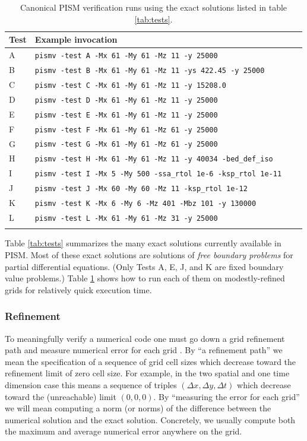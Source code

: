 \documentclass[11pt,final]{amsart}
\begin{document}
\begin{table}[ht]
\caption{Canonical PISM verification runs using the exact solutions listed in table \ref{tab:tests}.}\label{tab:tests_exec}
\small
\begin{tabular}{@{}llll}\hline
\textbf{Test} & \textbf{Example invocation}  \\ \hline
A & \verb|pismv -test A -Mx 61 -My 61 -Mz 11 -y 25000| \\
B & \verb|pismv -test B -Mx 61 -My 61 -Mz 11 -ys 422.45 -y 25000|  \\
C & \verb|pismv -test C -Mx 61 -My 61 -Mz 11 -y 15208.0|  \\
D & \verb|pismv -test D -Mx 61 -My 61 -Mz 11 -y 25000|  \\
E & \verb|pismv -test E -Mx 61 -My 61 -Mz 11 -y 25000|  \\
F & \verb|pismv -test F -Mx 61 -My 61 -Mz 61 -y 25000|  \\
G & \verb|pismv -test G -Mx 61 -My 61 -Mz 61 -y 25000|  \\
H & \verb|pismv -test H -Mx 61 -My 61 -Mz 11 -y 40034 -bed_def_iso| \\
I & \verb|pismv -test I -Mx 5 -My 500 -ssa_rtol 1e-6 -ksp_rtol 1e-11| \\
J & \verb|pismv -test J -Mx 60 -My 60 -Mz 11 -ksp_rtol 1e-12| \\
K & \verb|pismv -test K -Mx 6 -My 6 -Mz 401 -Mbz 101 -y 130000| \\
L & \verb|pismv -test L -Mx 61 -My 61 -Mz 31 -y 25000| \\
\hline
\normalsize
\end{tabular}
\end{table}

Table \ref{tab:tests} summarizes the many exact solutions currently available in PISM.  Most of these exact solutions are solutions of \emph{free boundary problems} for partial differential equations.  (Only Tests A, E, J, and K are fixed boundary value problems.)  Table \ref{tab:tests_exec} shows how to run each of them on modestly-refined grids for relatively quick execution time.


\subsubsection*{Refinement}  To meaningfully verify a numerical code one must go down a grid refinement path and measure numerical error for each grid \cite{Roache}.  By ``a refinement path'' we mean the specification of a sequence of grid cell sizes which decrease toward the refinement limit of zero cell size.  For example, in the two spatial and one time dimension case this means a sequence of triples $(\Delta x,\Delta y,\Delta t)$ which decrease toward the (unreachable) limit $(0,0,0)$.  By ``measuring the error for each grid'' we will mean computing a norm (or norms) of the difference between the numerical solution and the exact solution.   Concretely, we usually compute both the maximum and average numerical error anywhere on the grid.
\end{document}
